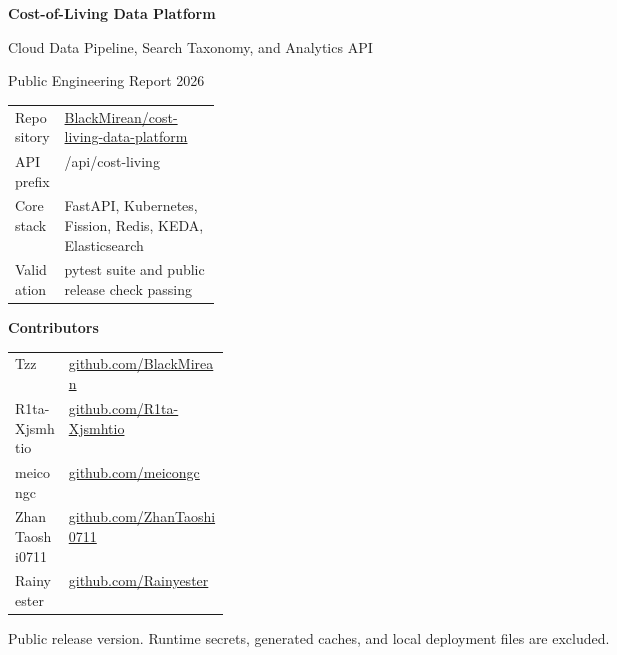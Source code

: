 \documentclass[11pt,a4paper]{article}
\renewcommand{\texttt}[1]{{\small\ttfamily\textcolor{black!85}{#1}}}
\newcommand{\idx}[1]{\texttt{#1}}
\begin{document}
\begin{titlepage}
\thispagestyle{empty}
\centering
\vspace*{0.8cm}
{\sffamily\Huge\bfseries Cost-of-Living Data Platform\par}
\vspace{0.35cm}
{\sffamily\Large Cloud Data Pipeline, Search Taxonomy, and Analytics API\par}
\vspace{0.75cm}
{\large Public Engineering Report \textbar{} 2026\par}
\vspace{1.0cm}

\begin{tabularx}{0.88\linewidth}{p{0.24\linewidth}Y}
\toprule
Repository & \href{https://github.com/BlackMirean/cost-living-data-platform}{BlackMirean/cost-living-data-platform} \\
API prefix & \idx{/api/cost-living} \\
Core stack & FastAPI, Kubernetes, Fission, Redis, KEDA, Elasticsearch \\
Validation & pytest suite and public release check passing \\
\bottomrule
\end{tabularx}

\vspace{1.05cm}
{\sffamily\bfseries\Large Contributors\par}
\vspace{0.35cm}
\begin{tabularx}{0.88\linewidth}{p{0.25\linewidth}Y}
\toprule
Tzz & \href{https://github.com/BlackMirean}{github.com/BlackMirean} \\
R1ta-Xjsmhtio & \href{https://github.com/R1ta-Xjsmhtio}{github.com/R1ta-Xjsmhtio} \\
meicongc & \href{https://github.com/meicongc}{github.com/meicongc} \\
ZhanTaoshi0711 & \href{https://github.com/ZhanTaoshi0711}{github.com/ZhanTaoshi0711} \\
Rainyester & \href{https://github.com/Rainyester}{github.com/Rainyester} \\
\bottomrule
\end{tabularx}

\vfill
{\small Public release version. Runtime secrets, generated caches, and local deployment files are excluded.\par}
\end{titlepage}
\end{document}
